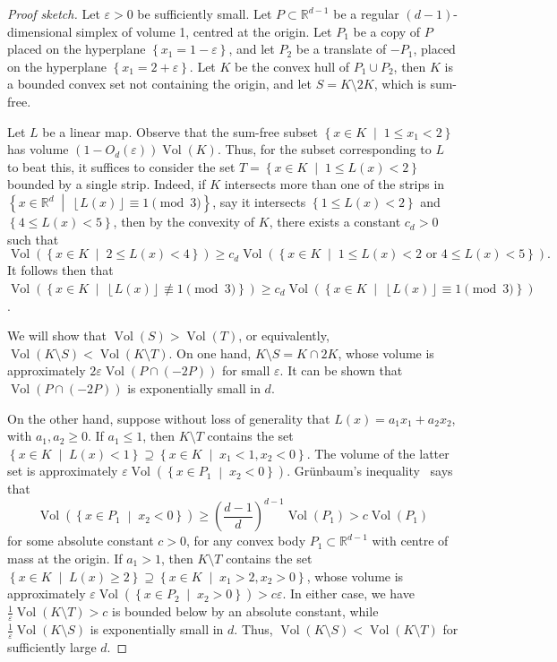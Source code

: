 \documentclass{article}
\newcommand{\floor}[1]{\left\lfloor #1 \right\rfloor}
\newcommand{\paren}[1]{\left( #1 \right)}
\newcommand{\set}[1]{\left\{ #1 \right\}}
\newcommand{\setcond}[2]{\left\{ #1 \;\middle\vert\; #2 \right\}}
\newcommand{\RR}{\mathbb{R}}
\theoremstyle{definition}
\DeclareMathOperator{\Vol}{Vol}
\begin{document}
\begin{proof}[Proof sketch]
    Let $\varepsilon>0$ be sufficiently small. Let $P\subset \RR^{d-1}$ be a regular $(d-1)$-dimensional simplex of volume 1, centred at the origin. Let $P_1$ be a copy of $P$ placed on the hyperplane $\set{x_1=1-\varepsilon}$, and let $P_2$ be a translate of $-P_1$, placed on the hyperplane $\set{x_1=2+\varepsilon}$. Let $K$ be the convex hull of $P_1\cup P_2$, then $K$ is a bounded convex set not containing the origin, and let $S=K\setminus 2K$, which is sum-free. 

    Let $L$ be a linear map. Observe that the sum-free subset $\setcond{x\in K}{1\leq x_1<2}$ has volume $(1-O_d(\varepsilon))\Vol(K)$. Thus, for the subset corresponding to $L$ to beat this, it suffices to consider the set $T=\setcond{x\in K}{1\leq L(x)<2}$ bounded by a single strip. Indeed, if $K$ intersects more than one of the strips in $\setcond{x\in \RR^d}{\floor{L(x)}\equiv 1\pmod{3}}$, say it intersects $\set{1\leq L(x)<2}$ and $\set{4\leq L(x)<5}$, then by the convexity of $K$, there exists a constant $c_d>0$ such that
    \[\Vol(\setcond{x\in K}{2\leq L(x)<4}) \geq c_d \Vol(\setcond{x\in K}{1\leq L(x)<2 \text{ or } 4\leq L(x)<5}).\]
    It follows then that $\Vol(\setcond{x\in K}{\floor{L(x)}\not\equiv 1\pmod{3}}) \geq c_d\Vol(\setcond{x\in K}{\floor{L(x)}\equiv 1\pmod{3}})$.
    
    We will show that $\Vol(S) > \Vol(T)$, or equivalently, $\Vol(K\setminus S) < \Vol(K\setminus T)$. On one hand, $K\setminus S=K\cap 2K$, whose volume is approximately $2\varepsilon \Vol(P\cap (-2P))$ for small $\varepsilon$. It can be shown that $\Vol(P\cap (-2P))$ is exponentially small in $d$. 
    
    On the other hand, suppose without loss of generality that $L(x)=a_1x_1+a_2x_2$, with $a_1,a_2\geq 0$. If $a_1\leq 1$, then $K\setminus T$ contains the set $\setcond{x\in K}{L(x)<1}\supseteq \setcond{x\in K}{x_1<1,x_2<0}$. The volume of the latter set is approximately $\varepsilon \Vol(\setcond{x\in P_1}{x_2<0})$. Gr\"unbaum's inequality~\cite{G60} says that 
    \[\Vol(\setcond{x\in P_1}{x_2<0})\geq \paren{\frac{d-1}{d}}^{d-1}\Vol(P_1)>c\Vol(P_1)\]
    for some absolute constant $c>0$, for any convex body $P_1\subset \RR^{d-1}$ with centre of mass at the origin. If $a_1>1$, then $K\setminus T$ contains the set $\setcond{x\in K}{L(x)\geq 2}\supseteq \setcond{x\in K}{x_1>2,x_2>0}$, whose volume is approximately $\varepsilon \Vol(\setcond{x\in P_2}{x_2>0})>c\varepsilon$. In either case, we have $\frac{1}{\varepsilon}\Vol(K\setminus T)>c$ is bounded below by an absolute constant, while $\frac{1}{\varepsilon}\Vol(K\setminus S)$ is exponentially small in $d$. Thus, $\Vol(K\setminus S) < \Vol(K\setminus T)$ for sufficiently large $d$.
\end{proof}
\end{document}
